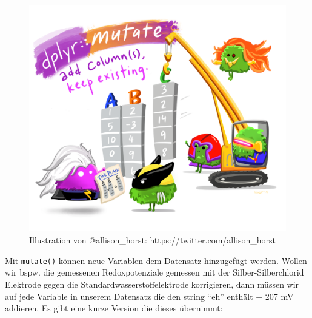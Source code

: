 \documentclass[
]{article}
\begin{document}
\begin{figure}

{\centering \includegraphics[width=1\linewidth]{images/040} 

}

\caption{Illustration von @allison_horst: https://twitter.com/allison_horst}\label{fig:unnamed-chunk-136}
\end{figure}

Mit \texttt{mutate()} können neue Variablen dem Datensatz hinzugefügt werden. Wollen wir bspw. die gemessenen Redoxpotenziale gemessen mit der Silber-Silberchlorid Elektrode gegen die Standardwasserstoffelektrode korrigieren, dann müssen wir auf jede Variable in unserem Datensatz die den string ``eh'' enthält + 207 mV addieren. Es gibt eine kurze Version die dieses übernimmt:
\end{document}
